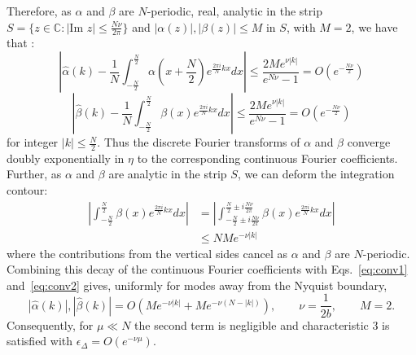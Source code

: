 Therefore, as $\alpha$ and $\beta$ are $N$-periodic, real, analytic in the strip $S =\{z \in \mathbb{C}: |\text{Im } z| \leq \frac{N\nu}{2\pi}\}$ and $|\alpha(z)|, |\beta(z)| \leq M$ in $S$, with $M = 2$, we have that \cite{trefethen2014exponentially}:
\begin{equation}
\label{eq:conv1}
    \left|\hat\alpha(k) - \frac{1}{N}\int_{-\frac{N}{2}}^{\frac{N}{2}}\alpha(x+\frac{N}{2})e^{\frac{2\pi i}{N}kx} dx\right| \leq \frac{2 Me^{\nu |k|}}{e^{N\nu}-1} = O(e^{-\frac{N\nu}{2}})
\end{equation}
\begin{equation}
\label{eq:conv2}
    \left|\hat\beta(k) - \frac{1}{N}\int_{-\frac{N}{2}}^{\frac{N}{2}}\beta(x)e^{\frac{2\pi i}{N}kx} dx\right| \leq  \frac{2 Me^{\nu |k|}}{e^{N\nu}-1} = O(e^{-\frac{N\nu}{2}})
\end{equation}
for integer $|k| \leq \frac{N}{2}$. Thus the discrete Fourier transforms of $\alpha$ and $\beta$ converge doubly exponentially in $\eta$ to the corresponding continuous Fourier coefficients. Further, as $\alpha$ and $\beta$ are analytic in the strip $S$, we can deform the integration contour:
\begin{align}
    \left|\int_{-\frac{N}{2}}^{\frac{N}{2}}\beta(x)e^{\frac{2\pi i}{N}kx} dx\right| &=\left| \int_{-\frac{N}{2}\pm i\frac{N\nu}{2\pi}}^{\frac{N}{2}\pm i\frac{N\nu}{2\pi}}\beta(x)e^{\frac{2\pi i}{N}kx} dx\right|\\
    &\leq NMe^{-\nu|k|}
    \label{eq:tails}
\end{align}
where the contributions from the vertical sides cancel as $\alpha$ and $\beta$ are $N$-periodic. Combining this decay of the continuous Fourier coefficients with Eqs.~\eqref{eq:conv1} and~\eqref{eq:conv2} gives, uniformly for modes away from the Nyquist boundary,
\begin{equation}
\label{eq:exactdecay}
    |\hat \alpha(k)|, |\hat \beta(k)| = O\!\left(M e^{-\nu|k|}
    +M e^{-\nu(N-|k|)}\right),
    \qquad \nu = \frac{1}{2b}, \qquad M=2.
\end{equation}
Consequently, for $\mu\ll N$ the second term is negligible and characteristic 3 is satisfied with $\epsilon_{\Delta}=O(e^{-\nu\mu})$.
